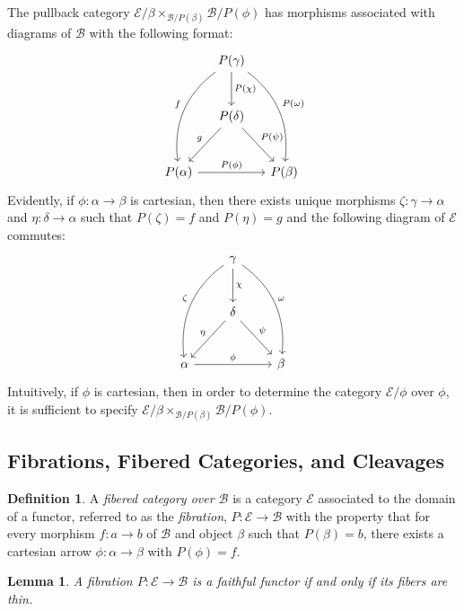 \documentclass[12pt]{article}
\newtheorem{lem}[thm]{Lemma}
\theoremstyle{definition}
\newtheorem{defn}{Definition}[section]
\theoremstyle{remark}
\newcommand{\catB}{\mathcal{B}}
\newcommand{\catE}{\mathcal{E}}
\begin{document}
The pullback category $\catE / \beta \times_{\catB / P(\beta)} \catB / P(\phi)$ has morphisms associated with diagrams of $\catB$ with the following format:
\begin{equation}
    \begin{tikzcd}[row sep=large, column sep=small]
        & P(\gamma) \arrow[d, "P(\chi)"] \arrow[ddl, bend right, "f"'] \arrow[ddr, bend left, "P(\omega)"] & \\
        & P(\delta) \arrow[dl, "g"'] \arrow[dr, "P(\psi)"] & \\
        P(\alpha) \arrow[rr, "P(\phi)"] & & P(\beta)
    \end{tikzcd}
    \label{eq:pullback_category_cartesian}
\end{equation}
Evidently, if $\phi : \alpha \to \beta$ is cartesian, then there exists unique morphisms $\zeta : \gamma \to \alpha$ and $\eta : \delta \to \alpha$ such that $P(\zeta) = f$ and $P(\eta) = g$ and the following diagram of $\catE$ commutes:
\begin{equation}
    \begin{tikzcd}[row sep=large]
        & \gamma \arrow[d, "\chi"] \arrow[ddl, bend right, "\zeta"'] \arrow[ddr, bend left, "\omega"] & \\
        & \delta \arrow[dl, "\eta"'] \arrow[dr, "\psi"] & \\
        \alpha \arrow[rr, "\phi"] & & \beta
    \end{tikzcd}
    \label{eq:cartesian_over_category}
\end{equation}
Intuitively, if $\phi$ is cartesian, then in order to determine the category $\catE/\phi$ over $\phi$, it is sufficient to specify $\catE / \beta \times_{\catB / P(\beta)} \catB / P(\phi)$.

\subsection{Fibrations, Fibered Categories, and Cleavages}

\begin{defn}
    A \textit{fibered category over $\catB$} is a category $\catE$ associated to the domain of a functor, referred to as the \textit{fibration}, $P : \catE \to \catB$ with the property that for every morphism $f : a \to b$ of $\catB$ and object $\beta$ such that $P(\beta) = b$, there exists a cartesian arrow $\phi : \alpha \to \beta$ with $P(\phi) = f$.
\end{defn}

\begin{lem}
    A fibration $P : \catE \to \catB$ is a faithful functor if and only if its fibers are thin.
\end{lem}
\end{document}
